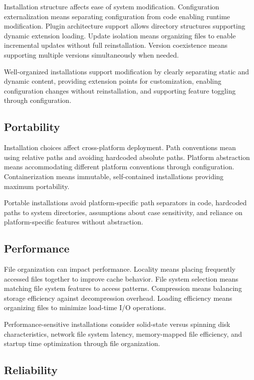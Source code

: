\documentclass[11pt]{article}
\begin{document}
Installation structure affects ease of system modification. Configuration externalization means separating configuration from code enabling runtime modification. Plugin architecture support allows directory structures supporting dynamic extension loading. Update isolation means organizing files to enable incremental updates without full reinstallation. Version coexistence means supporting multiple versions simultaneously when needed.

Well-organized installations support modification by clearly separating static and dynamic content, providing extension points for customization, enabling configuration changes without reinstallation, and supporting feature toggling through configuration.

\subsection{Portability}

Installation choices affect cross-platform deployment. Path conventions mean using relative paths and avoiding hardcoded absolute paths. Platform abstraction means accommodating different platform conventions through configuration. Containerization means immutable, self-contained installations providing maximum portability.

Portable installations avoid platform-specific path separators in code, hardcoded paths to system directories, assumptions about case sensitivity, and reliance on platform-specific features without abstraction.

\subsection{Performance}

File organization can impact performance. Locality means placing frequently accessed files together to improve cache behavior. File system selection means matching file system features to access patterns. Compression means balancing storage efficiency against decompression overhead. Loading efficiency means organizing files to minimize load-time I/O operations.

Performance-sensitive installations consider solid-state versus spinning disk characteristics, network file system latency, memory-mapped file efficiency, and startup time optimization through file organization.

\subsection{Reliability}
\end{document}
